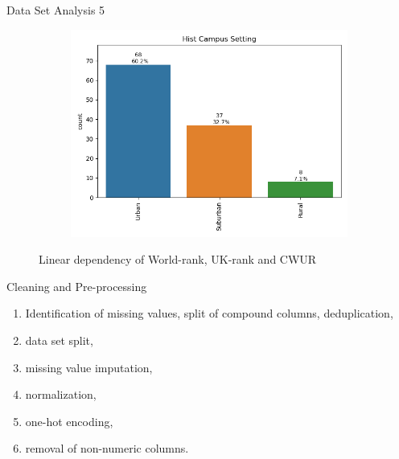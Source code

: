 \documentclass[xcolor=table]{beamer} %
\begin{document}
\begin{frame}{Data Set Analysis 5}
\begin{figure}
\begin{subfigure}[b]{0.48\textwidth}
          \label{fig:hist_international}
      \end{subfigure}
      \hfill
      \vspace{-1cm}
      \begin{subfigure}[b]{0.38\textwidth}
        \centering
        \includegraphics[width=\textwidth, trim={0 0 0 0}, clip]{./figs/bar_hist campus setting.png}
        \label{fig:hist_campus}
      \end{subfigure}

    \caption{Linear dependency of World-rank, UK-rank and CWUR}
    \label{fig:analysis_5}
    \end{figure}
\end{frame}

\begin{frame}{Cleaning and Pre-processing}
  \vspace{-1cm}
  \begin{enumerate}
      \item Identification of missing values, split of compound columns, deduplication,
      \item data set split,
      \item missing value imputation,
      \item normalization,
      \item one-hot encoding,
      \item removal of non-numeric columns.
  \end{enumerate}
\end{frame}
\end{document}
